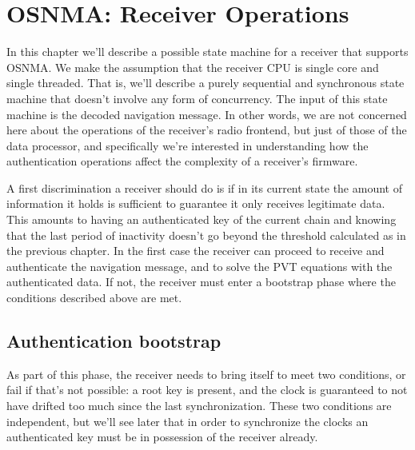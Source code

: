 \chapter{OSNMA: Receiver Operations}
\label{ch:osnma_operations}

In this chapter we'll describe a possible state machine for a receiver that
supports OSNMA. We make the assumption that the receiver CPU is single core and
single threaded. That is, we'll describe a purely sequential and synchronous
state machine that doesn't involve any form of concurrency. The input of this
state machine is the decoded navigation message. In other words, we are not
concerned here about the operations of the receiver's radio frontend, but just
of those of the data processor, and specifically we're interested in
understanding how the authentication operations affect the complexity of a
receiver's firmware.

A first discrimination a receiver should do is if in its current state the
amount of information it holds is sufficient to guarantee it only receives
legitimate data. This amounts to having an authenticated key of the current
chain and knowing that the last period of inactivity doesn't go beyond the
threshold calculated as in the previous chapter. In the first case the receiver
can proceed to receive and authenticate the navigation message, and to solve the
PVT equations with the authenticated data. If not, the receiver must enter a
bootstrap phase where the conditions described above are met.

\section{Authentication bootstrap}
As part of this phase, the receiver needs to bring itself to meet two
conditions, or fail if that's not possible: a root key is present, and the clock
is guaranteed to not have drifted too much since the last synchronization. These
two conditions are independent, but we'll see later that in order to synchronize
the clocks an authenticated key must be in possession of the receiver already.

